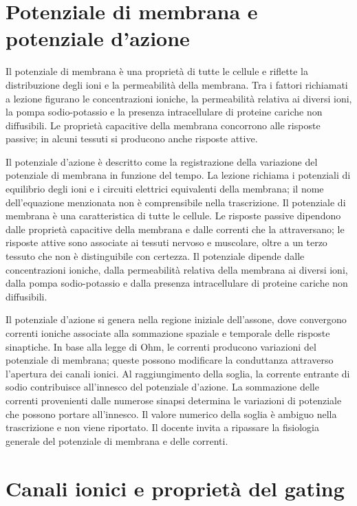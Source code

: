 \section{Potenziale di membrana e potenziale d'azione}

Il potenziale di membrana è una proprietà di tutte le cellule e riflette la distribuzione degli ioni e la permeabilità della membrana. Tra i fattori richiamati a lezione figurano le concentrazioni ioniche, la permeabilità relativa ai diversi ioni, la pompa sodio-potassio e la presenza intracellulare di proteine cariche non diffusibili. Le proprietà capacitive della membrana concorrono alle risposte passive; in alcuni tessuti si producono anche risposte attive.

Il potenziale d'azione è descritto come la registrazione della variazione del potenziale di membrana in funzione del tempo. La lezione richiama i potenziali di equilibrio degli ioni e i circuiti elettrici equivalenti della membrana; il nome dell'equazione menzionata non è comprensibile nella trascrizione. Il potenziale di membrana è una caratteristica di tutte le cellule. Le risposte passive dipendono dalle proprietà capacitive della membrana e dalle correnti che la attraversano; le risposte attive sono associate ai tessuti nervoso e muscolare, oltre a un terzo tessuto che non è distinguibile con certezza. Il potenziale dipende dalle concentrazioni ioniche, dalla permeabilità relativa della membrana ai diversi ioni, dalla pompa sodio-potassio e dalla presenza intracellulare di proteine cariche non diffusibili.

Il potenziale d'azione si genera nella regione iniziale dell'assone, dove convergono correnti ioniche associate alla sommazione spaziale e temporale delle risposte sinaptiche. In base alla legge di Ohm, le correnti producono variazioni del potenziale di membrana; queste possono modificare la conduttanza attraverso l'apertura dei canali ionici. Al raggiungimento della soglia, la corrente entrante di sodio contribuisce all'innesco del potenziale d'azione. La sommazione delle correnti provenienti dalle numerose sinapsi determina le variazioni di potenziale che possono portare all'innesco. Il valore numerico della soglia è ambiguo nella trascrizione e non viene riportato. Il docente invita a ripassare la fisiologia generale del potenziale di membrana e delle correnti.

\section{Canali ionici e proprietà del gating}

